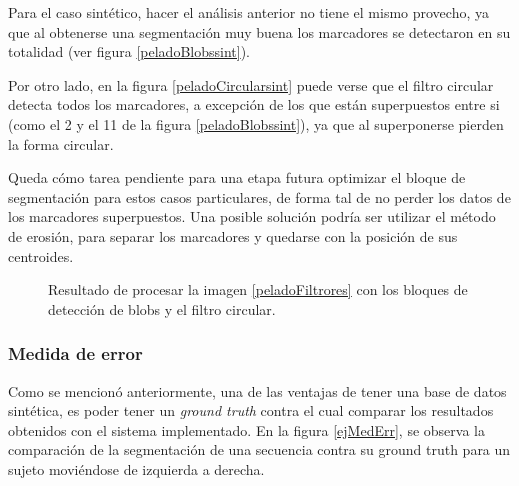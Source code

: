 Para el caso sintético, hacer el análisis anterior no tiene el mismo provecho, ya que al obtenerse una segmentación muy buena los marcadores se detectaron en su totalidad (ver figura \ref{peladoBlobssint}). 

Por otro lado, en la figura \ref{peladoCircularsint} puede verse que el filtro circular detecta todos los marcadores, a excepción de los que están superpuestos entre si (como el 2 y el 11 de la figura \ref{peladoBlobssint}), ya que al superponerse pierden la forma circular.

 Queda cómo tarea pendiente para una etapa futura optimizar el bloque de segmentación para estos casos particulares, de forma tal de no perder los datos de los marcadores superpuestos. Una posible solución podría ser utilizar el método de erosión, para separar los marcadores y quedarse con la posición de sus centroides.

\begin{figure}[H]
        \centering
         
  \caption{Resultado de procesar la imagen \ref{peladoFiltrores} con los bloques de detección de blobs y el filtro circular.}
      \label{detectMarcadoresSinteticos}
\end{figure}

\subsubsection{Medida de error}
Como se mencionó anteriormente, una de las ventajas de tener una base de datos sintética, es poder tener un \textit{ground truth} contra el cual comparar los resultados obtenidos con el sistema implementado. En la figura \ref{ejMedErr}, se observa la comparación de la segmentación de una secuencia contra su ground truth para un sujeto moviéndose de izquierda a derecha.

